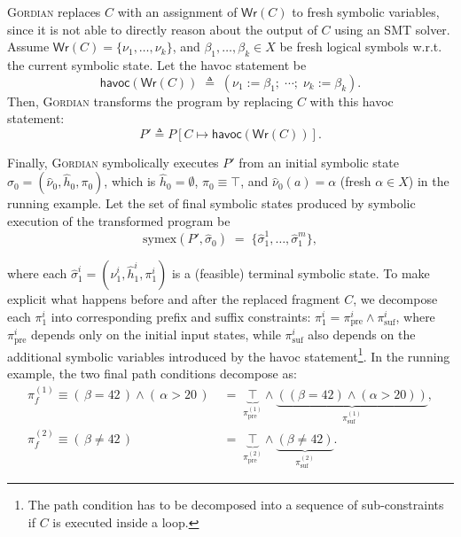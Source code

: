 \documentclass[acmsmall]{acmart}
\newcommand{\projName}{\textsc{Gordian}\xspace}
\theoremstyle{definition}
\begin{document}
\projName replaces $C$ with an assignment of $\mathsf{Wr}(C)$ to fresh symbolic variables, since it is not able to directly reason about the output of $C$ using an SMT solver. Assume \(\mathsf{Wr}(C)=\{\nu_1,\dots,\nu_k\}\), and \(\beta_1,\dots,\beta_k\in X\) be fresh logical symbols w.r.t. the current symbolic state. Let the havoc statement be
\[
\mathsf{havoc}(\mathsf{Wr}(C)) \;\triangleq\; (\nu_1 := \beta_1;\;\cdots;\; \nu_k := \beta_k).
\]
Then, \projName transforms the program by replacing $C$ with this havoc statement:
\[
P' \triangleq P[C \mapsto \mathsf{havoc}(\mathsf{Wr}(C))].
\]

Finally, \projName symbolically executes $P'$ from an initial symbolic state
$\hat\sigma_0=(\hat\nu_0,\hat h_0,\pi_0)$, which is $\hat h_0=\emptyset$, $\pi_0\equiv \top$, and $\hat\nu_0(a)=\alpha$ (fresh $\alpha\in X$) in the running example. Let the set of final symbolic states produced by symbolic execution of the transformed program be
\[
\mathrm{symex}(P',\hat\sigma_0)
\;=\;
\{\hat\sigma_1^1,\ldots,\hat\sigma_1^m\},
\]

\noindent where each \(\hat\sigma_1^i=(\hat\nu_1^i,\hat h_1^i,\pi_1^i)\) is a (feasible) terminal symbolic state. To make explicit what happens before and after the replaced fragment \(C\), we decompose each $\pi_1^i$ into corresponding prefix and suffix constraints: $\pi_1^i = \pi_\mathrm{pre}^i \wedge \pi_\mathrm{suf}^i$, where $\pi_\mathrm{pre}^i$ depends only on the initial input states, while $\pi_\mathrm{suf}^i$ also depends on the additional symbolic variables introduced by the havoc statement\footnote{The path condition has to be decomposed into a sequence of sub-constraints if $C$ is executed inside a loop.}. In the running example, the two final path conditions decompose as:
\begin{align*}
\pi_f^{(1)} \equiv (\,\beta = 42\,)\wedge(\,\alpha>20\,)
\;&=\;
\underbrace{\top}_{\pi_{\mathrm{pre}}^{(1)}}\wedge
\underbrace{((\beta=42)\wedge(\alpha>20))}_{\pi_{\mathrm{suf}}^{(1)}},\\
\pi_f^{(2)} \equiv (\,\beta \neq 42\,)
\;&=\;
\underbrace{\top}_{\pi_{\mathrm{pre}}^{(2)}}\wedge
\underbrace{(\beta\neq 42)}_{\pi_{\mathrm{suf}}^{(2)}}.
\end{align*}
\end{document}
